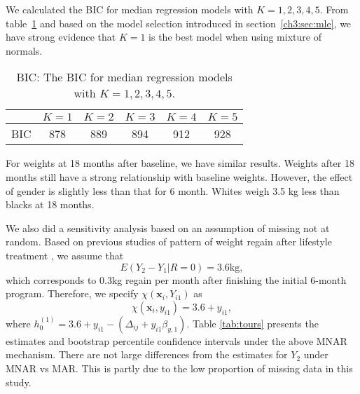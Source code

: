 \documentclass[useAMS,usenatbib,referee]{biom}
\begin{document}
We calculated the BIC for median regression models with $K = 1, 2, 3, 4, 5$. From table~\ref{tab:bic} and based on the model selection introduced in section~\ref{ch3:sec:mle}, we have strong evidence that $K = 1$ is the best model when using mixture of normals.

\begin{table}[htbp]
\caption[]{\label{tab:bic} BIC: The BIC for median regression models with $K = 1, 2, 3, 4, 5$.}
\vspace{4mm}
\begin{center}
\begin{tabular}[h]{cccccc}
\hline
& $K = 1$ & $K = 2$ & $K = 3$ & $K = 4$ & $K = 5$ \\
\hline
BIC & 878 & 889     & 894     & 912     & 928     \\
\hline
\end{tabular}
\end{center}
\end{table}

For weights at 18 months after baseline, we have similar results.
Weights after 18 months still have a strong relationship with baseline weights.
However, the effect of gender is slightly less than that for 6 month.
Whites weigh 3.5 kg less than blacks at 18 months.

We also did a sensitivity analysis based on an assumption of missing
not at random.  Based on previous studies of pattern of weight regain
after lifestyle treatment \citep{wadden2001, perri2008extended}, we
assume that
\begin{displaymath}
  E(Y_2 - Y_1| R=0) = 3.6 \mbox{kg},
\end{displaymath}
which corresponds to 0.3kg regain per month after finishing the
initial 6-month program.
Therefore, we specify  $\chi(\bm x_{i}, Y_{i1})$ as
\begin{displaymath}
\chi(\bm x_{i},  y_{i1}) = 3.6  + y_{i1},
\end{displaymath}
where $h_0^{(1)} = 3.6 + y_{i1} - (\Delta_{ij} + y_{i1} \beta_{y,1})$.
Table \ref{tab:tours} presents the estimates and bootstrap percentile
confidence intervals under the above MNAR mechanism. There are not
large differences from the estimates for $Y_2$ under MNAR vs MAR. This is
partly due to the low proportion of missing data in this study.

\end{document}
